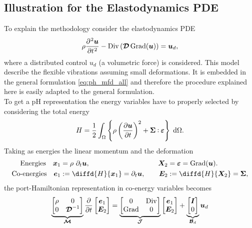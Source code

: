 \documentclass{svjour3}                     %
\DeclareMathOperator*{\Grad}{Grad}
\DeclareMathOperator*{\Div}{Div}
\def\onedot{$\mathsurround0pt\ldotp$}
\def\cddot{%
	\mathbin{\vcenter{\baselineskip.67ex
			\hbox{\onedot}\hbox{\onedot}}%
}}
\begin{document}
\subsection{Illustration for the Elastodynamics PDE}
To explain the methodology consider the elastodynamics PDE
\begin{equation*}
\rho \diffp[2]{\bm{u}}{t} - \Div\left(\bm{\mathcal{D}} \Grad(\bm{u})\right) = \bm{u}_d,
\end{equation*}
where a distributed control $u_d$ (a volumetric force) is considered. This model describe the flexible vibrations assuming small deformations. It is embedded in the general formulation \eqref{eq:ph_mfd_all} and therefore the procedure explained here is easily adapted to the general formulation. \\
To get a pH representation the energy variables have to properly selected by considering the total energy
\[\displaystyle H = \frac{1}{2} \int_{\Omega} \left\{\rho \left(\diffp{\bm{u}}{t}\right)^2 + \bm\Sigma \cddot \bm\varepsilon \right\} \d{\Omega}.
\]
Taking as energies the linear momentum and the deformation
\begin{equation}
\begin{aligned}
\text{Energies} \quad  \bm{x}_1 &= \rho \ \partial_t \bm{u}, \\
\text{Co-energies} \quad \bm{e}_1 &:= \diffd{H}{\bm{x}_1} =  \partial_t \bm{u}, \\
\end{aligned} \qquad
\begin{aligned}
\bm{X}_2 &= \bm\varepsilon = \Grad(\bm{u}). \\
\bm{E}_2 &:= \diffd{H}{\bm{X}_2} = \bm\Sigma,
\end{aligned}
\end{equation}
the port-Hamiltonian representation in co-energy variables becomes
\begin{equation*}
\underbrace{\begin{bmatrix}
\rho & 0 \\ 0 & \bm{\mathcal{D}}^{-1} \\
\end{bmatrix}}_{\bm{\mathcal{M}}}
\diffp{}{t}
\begin{bmatrix}
\bm{e}_1 \\ \bm{E}_2 \\
\end{bmatrix} = 
\underbrace{\begin{bmatrix}
0 & \Div \\ \Grad & 0 \\
\end{bmatrix}}_{\bm{\mathcal{J}}}
\begin{bmatrix}
\bm{e}_1 \\ \bm{E}_2 \\
\end{bmatrix} + 
\underbrace{\begin{bmatrix}
\bm{I} \\ 0 \\
\end{bmatrix}}_{\bm{\mathcal{B}}_d} \bm{u}_d 
\end{equation*}
\end{document}
